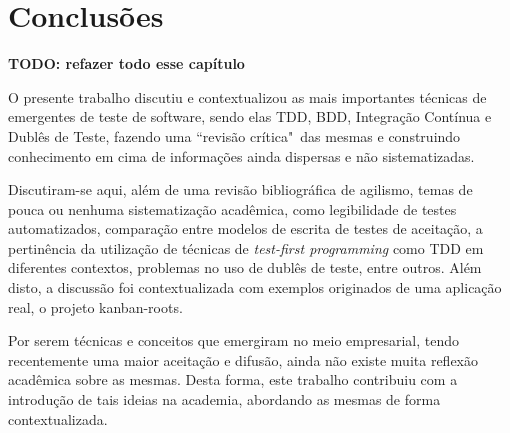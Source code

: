 \chapter{Conclusões} %
\label{cha:conclusoes}

\textbf{TODO: refazer todo esse capítulo}

O presente trabalho discutiu e contextualizou as mais importantes técnicas de emergentes de teste de software, sendo elas TDD, BDD, Integração Contínua e Dublês de Teste, fazendo uma ``revisão crítica"\ das mesmas e construindo conhecimento em cima de informações ainda dispersas e não sistematizadas.

Discutiram-se aqui, além de uma revisão bibliográfica de agilismo, temas de pouca ou nenhuma sistematização acadêmica, como legibilidade de testes automatizados, comparação entre modelos de escrita de testes de aceitação, a pertinência da utilização de técnicas de \textit{test-first programming} como TDD em diferentes contextos, problemas no uso de dublês de teste, entre outros. Além disto, a discussão foi contextualizada com exemplos originados de uma aplicação real, o projeto kanban-roots.

Por serem técnicas e conceitos que emergiram no meio empresarial, tendo recentemente uma maior aceitação e difusão, ainda não existe muita reflexão acadêmica sobre as mesmas. Desta forma, este trabalho contribuiu com a introdução de tais ideias na academia, abordando as mesmas de forma contextualizada.

